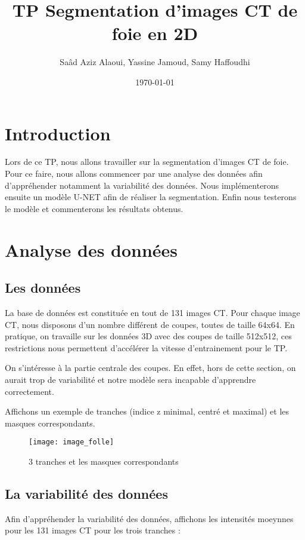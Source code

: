 \documentclass[12pt,a4paper,titlepage]{article}
\title{TP Segmentation d'images CT de foie en 2D}
\author{Saâd Aziz Alaoui, Yassine Jamoud, Samy Haffoudhi}
\date{\today}
\begin{document}
\maketitle

\section*{Introduction}

Lors de ce TP, nous allons travailler sur la segmentation d'images CT
de foie. Pour ce faire, nous allons commencer par une analyse des données
afin d'appréhender notamment la variabilité des données. Nous
implémenterons ensuite un modèle U-NET afin de réaliser la segmentation.
Enfin nous testerons le modèle et commenterons les résultats obtenus.

\section{Analyse des données}

\subsection{Les données}

La base de données est constituée en tout de 131 images CT.
Pour chaque image CT, nous disposons d'un nombre différent de coupes, toutes
de taille 64x64. En pratique, on travaille sur les données 3D avec des
coupes de taille 512x512, ces restrictions nous permettent d'accélérer
la vitesse d'entrainement pour le TP.

On s'intéresse à la partie centrale des coupes. En effet, hors de cette
section, on aurait trop de variabilité et notre modèle sera incapable
d'apprendre correctement.

Affichons un exemple de tranches (indice z minimal, centré et maximal) et
les masques correspondants.

\begin{figure}[H]
    \caption{3 tranches et les masques correspondants}
    \texttt{[image: image\_folle]}
    \centering
\end{figure}

\subsection{La variabilité des données}

Afin d'appréhender la variabilité des données, affichons les intensités
moeynnes pour les 131 images CT pour les trois tranches :
\end{document}

